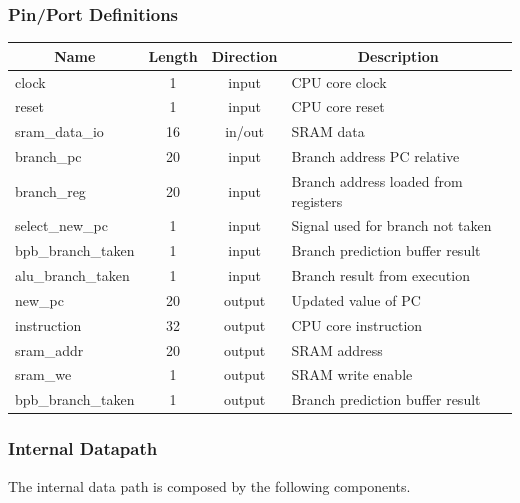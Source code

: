 \documentclass{article}
\begin{document}
  \subsubsection{Pin/Port Definitions}
  \FloatBarrier
  \begin{table}[H]
    \begin{center}
      \begin{tabular}[pos]{| l | c | c | m{7cm} |} \hline 	
      \multicolumn{1}{|c|}{\cellcolor[gray]{0.9}\textbf{Name}} & 
      \multicolumn{1}{c|}{\cellcolor[gray]{0.9}\textbf{Length}} & 
      \multicolumn{1}{c|}{\cellcolor[gray]{0.9}\textbf{Direction}} &
      \multicolumn{1}{c|}{\cellcolor[gray]{0.9}\textbf{Description}} \\ \hline
	 clock 		          & 1 	& input 	& CPU core clock  	\\ \hline
	 reset 		          & 1	  & input		& CPU core reset  	\\ \hline
	 sram\_data\_io     & 16	& in/out 	& SRAM data \\ \hline
	 branch\_pc 	      & 20	& input 	& Branch address PC relative \\ \hline
	 branch\_reg 	      & 20	& input 	& Branch address loaded from registers \\ \hline
   select\_new\_pc    & 1   & input   & Signal used for branch not taken \\ \hline
   bpb\_branch\_taken & 1   & input   & Branch prediction buffer result \\ \hline
   alu\_branch\_taken & 1   & input   & Branch result from execution \\ \hline
	 new\_pc 		        & 20	& output 	& Updated value of PC \\ \hline
	 instruction 	      & 32	& output 	& CPU core instruction  \\ \hline
	 sram\_addr 	      & 20	& output	& SRAM address \\ \hline
	 sram\_we 	        & 1	  & output 	& SRAM write enable  \\ \hline
   bpb\_branch\_taken & 1   & output  & Branch prediction buffer result \\ \hline
      \end{tabular}
    \end{center}
  \end{table} 

  \subsubsection{Internal Datapath} 
  The internal data path is composed by the following components.
\end{document}
